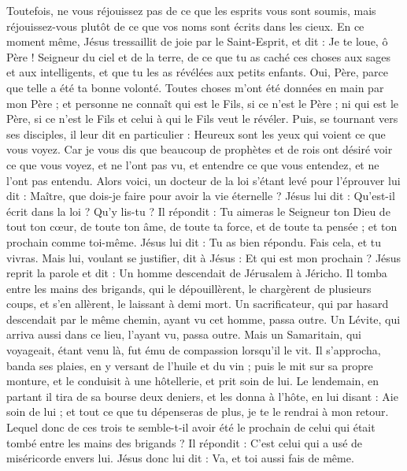 \begin{multicols}{2}
Toutefois, ne vous réjouissez pas de ce que les esprits vous sont soumis, mais réjouissez-vous plutôt de ce que vos noms sont écrits dans les cieux.
En ce moment même, Jésus tressaillit de joie par le Saint-Esprit, et dit : Je te loue, ô Père ! Seigneur du ciel et de la terre, de ce que tu as caché ces choses aux sages et aux intelligents, et que tu les as révélées aux petits enfants. Oui, Père, parce que telle a été ta bonne volonté.
Toutes choses m'ont été données en main par mon Père ; et personne ne connaît qui est le Fils, si ce n’est le Père ; ni qui est le Père, si ce n’est le Fils et celui à qui le Fils veut le révéler.
Puis, se tournant vers ses disciples, il leur dit en particulier : Heureux sont les yeux qui voient ce que vous voyez.
Car je vous dis que beaucoup de prophètes et de rois ont désiré voir ce que vous voyez, et ne l’ont pas vu, et entendre ce que vous entendez, et ne l’ont pas entendu.
Alors voici, un docteur de la loi s'étant levé pour l'éprouver lui dit : Maître, que dois-je faire pour avoir la vie éternelle ?
Jésus lui dit : Qu'est-il écrit dans la loi ? Qu’y lis-tu ?
Il répondit : Tu aimeras le Seigneur ton Dieu de tout ton cœur, de toute ton âme, de toute ta force, et de toute ta pensée ; et ton prochain comme toi-même.
Jésus lui dit : Tu as bien répondu. Fais cela, et tu vivras.
Mais lui, voulant se justifier, dit à Jésus : Et qui est mon prochain ?
Jésus reprit la parole et dit : Un homme descendait de Jérusalem à Jéricho. Il tomba entre les mains des brigands, qui le dépouillèrent, le chargèrent de plusieurs coups, et s’en allèrent, le laissant à demi mort.
Un sacrificateur, qui par hasard descendait par le même chemin, ayant vu cet homme, passa outre.
Un Lévite, qui arriva aussi dans ce lieu, l’ayant vu, passa outre.
Mais un Samaritain, qui voyageait, étant venu là, fut ému de compassion lorsqu’il le vit.
Il s'approcha, banda ses plaies, en y versant de l'huile et du vin ; puis le mit sur sa propre monture, et le conduisit à une hôtellerie, et prit soin de lui.
Le lendemain, en partant il tira de sa bourse deux deniers, et les donna à l'hôte, en lui disant : Aie soin de lui ; et tout ce que tu dépenseras de plus, je te le rendrai à mon retour.
Lequel donc de ces trois te semble-t-il avoir été le prochain de celui qui était tombé entre les mains des brigands ?
Il répondit : C’est celui qui a usé de miséricorde envers lui. Jésus donc lui dit : Va, et toi aussi fais de même.

\end{multicols}
